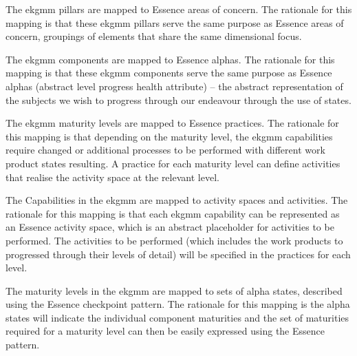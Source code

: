 \begin{description}[nosep,font=\bfseries]

  \item [areas of concern]
  The \gls{ekgmm} pillars are mapped to Essence areas of concern.
  The rationale for this mapping is that these \gls{ekgmm} pillars serve the same purpose as
  Essence areas of concern, groupings of elements that share the same dimensional focus.

  \item [alphas]
  The \gls{ekgmm} components are mapped to Essence alphas.
  The rationale for this mapping is that these \gls{ekgmm} components serve the same purpose as
  Essence alphas (abstract level progress health attribute) -- the abstract representation of the subjects
  we wish to progress through our endeavour through the use of states.

  \item [practices]
  The \gls{ekgmm} maturity levels are mapped to Essence practices.
  The rationale for this mapping is that depending on the maturity level, the \gls{ekgmm} capabilities
  require changed or additional processes to be performed with different work product states resulting.
  A practice for each maturity level can define activities that realise the activity space at the relevant level.

  \item [activity spaces, activities and work products]
  The Capabilities in the \gls{ekgmm} are mapped to activity spaces and activities.
  The rationale for this mapping is that each \gls{ekgmm} capability can be represented as an Essence activity space,
  which is an abstract placeholder for activities to be performed.
  The activities to be performed (which includes the work products to progressed through their levels of detail)
  will be specified in the practices for each level.

  \item [checkpoint pattern]
  The maturity levels in the \gls{ekgmm} are mapped to sets of alpha states, described using the
  Essence checkpoint pattern.
  The rationale for this mapping is the alpha states will indicate the individual component maturities and
  the set of maturities required for a maturity level can then be easily expressed using the Essence pattern.

\end{description}
